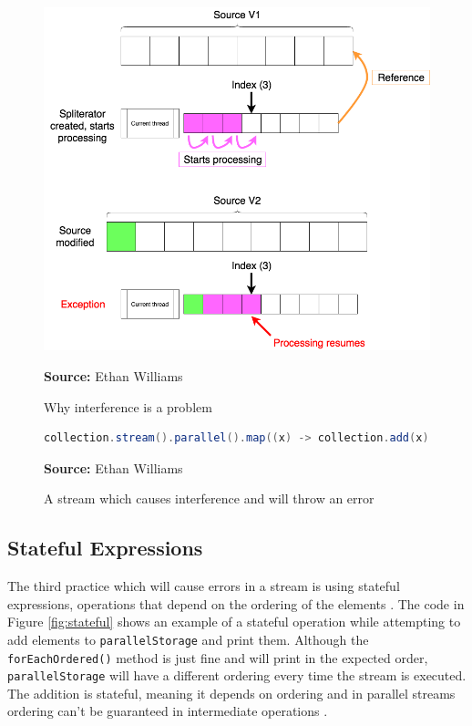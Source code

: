 \documentclass[oneside, 12pt]{article}
\newcommand{\source}[1]{\textbf{Source:} {#1} }
\begin{document}
\begin{figure}[H]
\centering
\includegraphics[width=13cm]{../images/interference.png}
\caption{Why interference is a problem}
\source{Ethan Williams}
\label{fig:interference_pic}
\end{figure}

\begin{figure}[H]
\centering
\begin{lstlisting}[language=Java]
collection.stream().parallel().map((x) -> collection.add(x)).toArray();
\end{lstlisting}
\caption{A stream which causes interference and will throw an error}
\source{Ethan Williams}
\label{fig:interference}
\end{figure}

\subsection{Stateful Expressions} \label{stateful_expressions}
The third practice which will cause errors in a stream  is using stateful expressions, operations that depend on the ordering of the elements \autocite{expression_state}. The code in Figure \ref{fig:stateful} shows an example of a stateful operation while attempting to add elements to \verb|parallelStorage| and print them. Although the \verb|forEachOrdered()| method is just fine and will print in the expected order, \verb|parallelStorage| will have a different ordering every time the stream is executed. The addition is stateful, meaning it depends on ordering and in parallel streams ordering can't be guaranteed in intermediate operations \autocite{parallelism_doc}.
\end{document}

